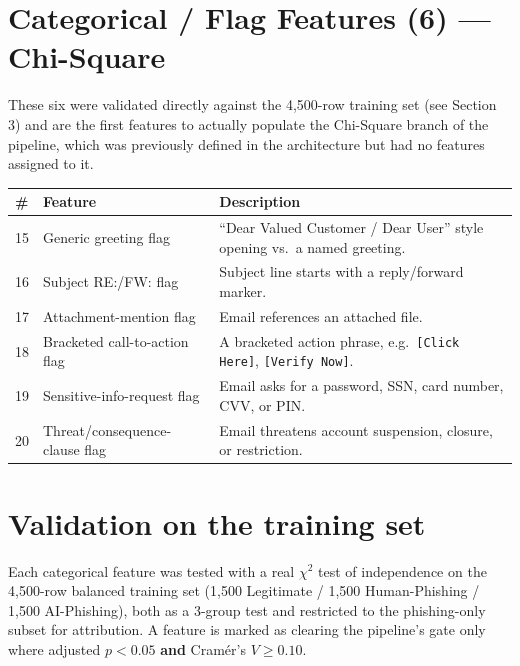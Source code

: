 \documentclass[11pt]{article}
\begin{document}
\section{Categorical / Flag Features (6) --- Chi-Square}

These six were validated directly against the 4,500-row training set (see Section 3) and are the
first features to actually populate the Chi-Square branch of the pipeline, which was previously
defined in the architecture but had no features assigned to it.

\renewcommand{\arraystretch}{1.3}
\begin{longtable}{@{}p{0.6cm}p{4.0cm}p{9.7cm}@{}}
\toprule
\textbf{\#} & \textbf{Feature} & \textbf{Description} \\
\midrule
\endhead
15 & Generic greeting flag & ``Dear Valued Customer / Dear User'' style opening vs.\ a named greeting. \\
16 & Subject RE:/FW: flag & Subject line starts with a reply/forward marker. \\
17 & Attachment-mention flag & Email references an attached file. \\
18 & Bracketed call-to-action flag & A bracketed action phrase, e.g.\ \texttt{[Click Here]}, \texttt{[Verify Now]}. \\
19 & Sensitive-info-request flag & Email asks for a password, SSN, card number, CVV, or PIN. \\
20 & Threat/consequence-clause flag & Email threatens account suspension, closure, or restriction. \\
\bottomrule
\end{longtable}

\section{Validation on the training set}
Each categorical feature was tested with a real $\chi^2$ test of independence on the 4{,}500-row
balanced training set (1{,}500 Legitimate / 1{,}500 Human-Phishing / 1{,}500 AI-Phishing), both as
a 3-group test and restricted to the phishing-only subset for attribution. A feature is marked as
clearing the pipeline's gate only where adjusted $p<0.05$ \textbf{and} Cram\'er's $V \geq 0.10$.
\end{document}

